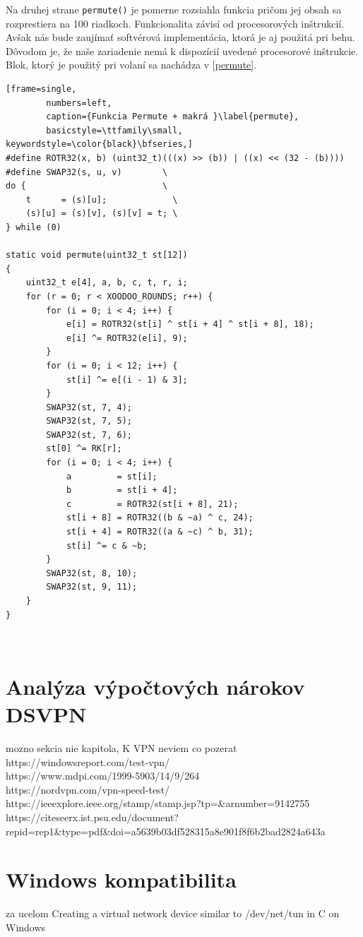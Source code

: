 Na druhej strane \lstinline|permute()| je pomerne rozsiahla funkcia pričom jej obsah sa rozprestiera na 100 riadkoch. Funkcionalita závisí od procesorových inštrukcií. Avšak nás bude zaujímať softvérová implementácia, ktorá je aj použitá pri behu. Dôvodom je, že naše zariadenie nemá k dispozícií uvedené procesorové inštrukcie. Blok, ktorý je použitý pri volaní sa nachádza v \ref{permute}.   

\begin{minipage}{\linewidth} 	
	\begin{lstlisting}[frame=single,
		numbers=left,
		caption={Funkcia Permute + makrá }\label{permute},
		basicstyle=\ttfamily\small, keywordstyle=\color{black}\bfseries,]
#define ROTR32(x, b) (uint32_t)(((x) >> (b)) | ((x) << (32 - (b))))
#define SWAP32(s, u, v)        \
do {                           \
	t      = (s)[u];             \
	(s)[u] = (s)[v], (s)[v] = t; \
} while (0)
	
static void permute(uint32_t st[12])
{
	uint32_t e[4], a, b, c, t, r, i;	
	for (r = 0; r < XOODOO_ROUNDS; r++) {
		for (i = 0; i < 4; i++) {
			e[i] = ROTR32(st[i] ^ st[i + 4] ^ st[i + 8], 18);
			e[i] ^= ROTR32(e[i], 9);
		}
		for (i = 0; i < 12; i++) {
			st[i] ^= e[(i - 1) & 3];
		}
		SWAP32(st, 7, 4);
		SWAP32(st, 7, 5);
		SWAP32(st, 7, 6);
		st[0] ^= RK[r];
		for (i = 0; i < 4; i++) {
			a         = st[i];
			b         = st[i + 4];
			c         = ROTR32(st[i + 8], 21);
			st[i + 8] = ROTR32((b & ~a) ^ c, 24);
			st[i + 4] = ROTR32((a & ~c) ^ b, 31);
			st[i] ^= c & ~b;
		}
		SWAP32(st, 8, 10);
		SWAP32(st, 9, 11);
	}	
}
	\end{lstlisting}
\end{minipage}\\ 
\section{Analýza výpočtových nárokov DSVPN}\label{analyza}
mozno sekcia nie kapitola, K VPN neviem co pozerat 
https://windowsreport.com/test-vpn/ \\
https://www.mdpi.com/1999-5903/14/9/264 \\
https://nordvpn.com/vpn-speed-test/ \\
https://ieeexplore.ieee.org/stamp/stamp.jsp?tp=\&arnumber=9142755 \\
https://citeseerx.ist.psu.edu/document?repid=rep1\&type=pdf\&doi=a5639b03df528315a8e901f8f6b2bad2824a643a \\

\section{Windows kompatibilita}
za ucelom Creating a virtual network device similar to /dev/net/tun in C on Windows

